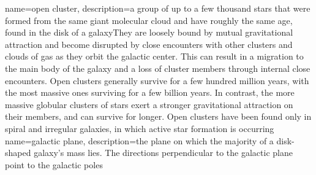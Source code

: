 {
	name={open cluster},
	description={a group of up to a few thousand stars that were formed from the same giant molecular cloud and have roughly the same age, found in the disk of a galaxyThey are loosely bound by mutual gravitational attraction and become disrupted by close encounters with other clusters and clouds of gas as they orbit the galactic center. This can result in a migration to the main body of the galaxy and a loss of cluster members through internal close encounters. Open clusters generally survive for a few hundred million years, with the most massive ones surviving for a few billion years. In contrast, the more massive globular clusters of stars exert a stronger gravitational attraction on their members, and can survive for longer. Open clusters have been found only in spiral and irregular galaxies, in which active star formation is occurring}
}
{
	name={galactic plane},
	description={the plane on which the majority of a disk-shaped galaxy's mass lies. The directions perpendicular to the galactic plane point to the galactic poles}
}